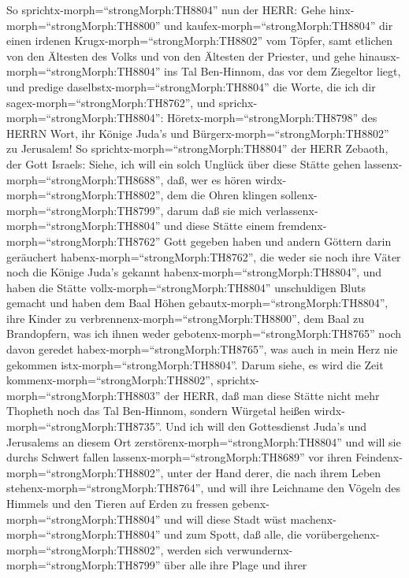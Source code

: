  So sprichtx-morph=``strongMorph:TH8804'' nun der HERR: Gehe
hinx-morph=``strongMorph:TH8800'' und
kaufex-morph=``strongMorph:TH8804'' dir einen irdenen
Krugx-morph=``strongMorph:TH8802'' vom Töpfer, samt etlichen von den
Ältesten des Volks und von den Ältesten der Priester,  und
gehe hinausx-morph=``strongMorph:TH8804'' ins Tal Ben-Hinnom, das vor
dem Ziegeltor liegt, und predige daselbstx-morph=``strongMorph:TH8804''
die Worte, die ich dir sagex-morph=``strongMorph:TH8762'', 
und sprichx-morph=``strongMorph:TH8804'':
Höretx-morph=``strongMorph:TH8798'' des HERRN Wort, ihr Könige Juda's
und Bürgerx-morph=``strongMorph:TH8802'' zu Jerusalem! So
sprichtx-morph=``strongMorph:TH8804'' der HERR Zebaoth, der Gott
Israels: Siehe, ich will ein solch Unglück über diese Stätte gehen
lassenx-morph=``strongMorph:TH8688'', daß, wer es hören
wirdx-morph=``strongMorph:TH8802'', dem die Ohren klingen
sollenx-morph=``strongMorph:TH8799'',  darum daß sie mich
verlassenx-morph=``strongMorph:TH8804'' und diese Stätte einem
fremdenx-morph=``strongMorph:TH8762'' Gott gegeben haben und andern
Göttern darin geräuchert habenx-morph=``strongMorph:TH8762'', die weder
sie noch ihre Väter noch die Könige Juda's gekannt
habenx-morph=``strongMorph:TH8804'', und haben die Stätte
vollx-morph=``strongMorph:TH8804'' unschuldigen Bluts gemacht
 und haben dem Baal Höhen
gebautx-morph=``strongMorph:TH8804'', ihre Kinder zu
verbrennenx-morph=``strongMorph:TH8800'', dem Baal zu Brandopfern, was
ich ihnen weder gebotenx-morph=``strongMorph:TH8765'' noch davon geredet
habex-morph=``strongMorph:TH8765'', was auch in mein Herz nie gekommen
istx-morph=``strongMorph:TH8804''.  Darum siehe, es wird die
Zeit kommenx-morph=``strongMorph:TH8802'',
sprichtx-morph=``strongMorph:TH8803'' der HERR, daß man diese Stätte
nicht mehr Thopheth noch das Tal Ben-Hinnom, sondern Würgetal heißen
wirdx-morph=``strongMorph:TH8735''.  Und ich will den
Gottesdienst Juda's und Jerusalems an diesem Ort
zerstörenx-morph=``strongMorph:TH8804'' und will sie durchs Schwert
fallen lassenx-morph=``strongMorph:TH8689'' vor ihren
Feindenx-morph=``strongMorph:TH8802'', unter der Hand derer, die nach
ihrem Leben stehenx-morph=``strongMorph:TH8764'', und will ihre
Leichname den Vögeln des Himmels und den Tieren auf Erden zu fressen
gebenx-morph=``strongMorph:TH8804''  und will diese Stadt
wüst machenx-morph=``strongMorph:TH8804'' und zum Spott, daß alle, die
vorübergehenx-morph=``strongMorph:TH8802'', werden sich
verwundernx-morph=``strongMorph:TH8799'' über alle ihre Plage und ihrer
